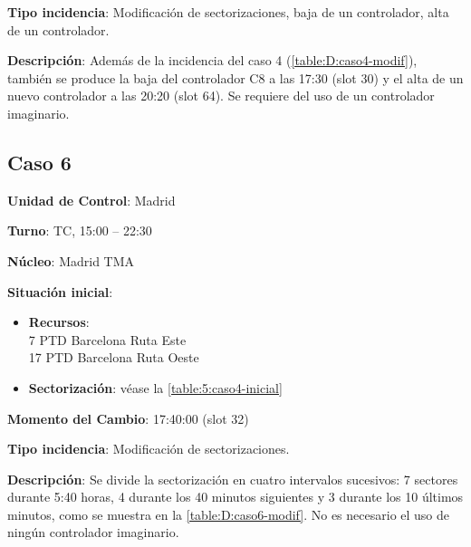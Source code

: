 \textbf{Tipo incidencia}: Modificación de sectorizaciones, baja de un controlador, alta de un controlador.

\textbf{Descripción}: Además de la incidencia del caso 4 (\autoref{table:D:caso4-modif}), también se produce la baja del controlador C8 a las 17:30 (slot 30) y el alta de un nuevo controlador a las 20:20 (slot 64). Se requiere del uso de un controlador imaginario.

\subsection{Caso 6}

\textbf{Unidad de Control}: Madrid

\textbf{Turno}: TC, 15:00 -- 22:30

\textbf{Núcleo}: Madrid TMA

\textbf{Situación inicial}:
\begin{itemize}[label={}]
	
	\item \textbf{Recursos}: \\
	7 PTD Barcelona Ruta Este \\
	17 PTD Barcelona Ruta Oeste
	
	
	\item \textbf{Sectorización}: véase la \autoref{table:5:caso4-inicial}

\end{itemize}

\textbf{Momento del Cambio}: 17:40:00 (slot 32)

\textbf{Tipo incidencia}: Modificación de sectorizaciones.

\textbf{Descripción}: Se divide la sectorización en cuatro intervalos sucesivos: 7 sectores durante 5:40 horas, 4 durante los 40 minutos siguientes y 3 durante los 10 últimos minutos, como se muestra en la \autoref{table:D:caso6-modif}. No es necesario el uso de ningún controlador imaginario.

